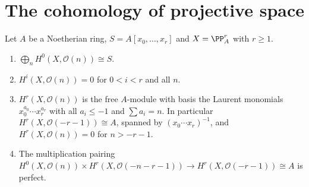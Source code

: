 \section{The cohomology of projective space}\label{schemes:section-projective-space}

\begin{theorem}\label{schemes:theorem-projective-space}
Let $A$ be a Noetherian ring, $S = A[x_0, \ldots, x_r]$ and $X = \PP^r_A$ with $r \geq 1$.
\begin{enumerate}
\item $\bigoplus_nH^0(X, \mathcal{O}(n)) \cong S$.
\item $H^i(X, \mathcal{O}(n)) = 0$ for $0 < i < r$ and all $n$.
\item $H^r(X, \mathcal{O}(n))$ is the free $A$-module with basis the Laurent monomials $x_0^{a_0} \cdots x_r^{a_r}$ with all $a_i \leq -1$ and $\sum a_i = n$. In particular
$H^r(X, \mathcal{O}(-r-1)) \cong A$, spanned by $(x_0 \cdots x_r)^{-1}$, and $H^r(X, \mathcal{O}(n)) = 0$ for $n > -r-1$.
\item The multiplication pairing $H^0(X, \mathcal{O}(n)) \times H^r(X, \mathcal{O}(-n-r-1)) \to H^r(X, \mathcal{O}(-r-1)) \cong A$ is perfect.
\end{enumerate}
\end{theorem}

